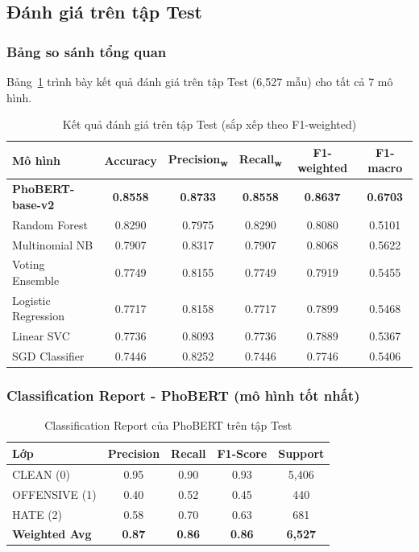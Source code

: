 \subsection{Đánh giá trên tập Test}

\subsubsection{Bảng so sánh tổng quan}

Bảng~\ref{tab:test_results} trình bày kết quả đánh giá trên tập Test (6{,}527 mẫu) cho tất cả 7 mô hình.

\begin{table}[H]
\centering
\caption{Kết quả đánh giá trên tập Test (sắp xếp theo F1-weighted)}
\label{tab:test_results}
\begin{tabular}{|l|c|c|c|c|c|}
\hline
\textbf{Mô hình} & \textbf{Accuracy} & \textbf{Precision\textsubscript{w}} & \textbf{Recall\textsubscript{w}} & \textbf{F1-weighted} & \textbf{F1-macro} \\
\hline
\textbf{PhoBERT-base-v2} & \textbf{0.8558} & \textbf{0.8733} & \textbf{0.8558} & \textbf{0.8637} & \textbf{0.6703} \\
Random Forest & 0.8290 & 0.7975 & 0.8290 & 0.8080 & 0.5101 \\
Multinomial NB & 0.7907 & 0.8317 & 0.7907 & 0.8068 & 0.5622 \\
Voting Ensemble & 0.7749 & 0.8155 & 0.7749 & 0.7919 & 0.5455 \\
Logistic Regression & 0.7717 & 0.8158 & 0.7717 & 0.7899 & 0.5468 \\
Linear SVC & 0.7736 & 0.8093 & 0.7736 & 0.7889 & 0.5367 \\
SGD Classifier & 0.7446 & 0.8252 & 0.7446 & 0.7746 & 0.5406 \\
\hline
\end{tabular}
\end{table}

\subsubsection{Classification Report - PhoBERT (mô hình tốt nhất)}

\begin{table}[H]
\centering
\caption{Classification Report của PhoBERT trên tập Test}
\label{tab:phobert_report}
\begin{tabular}{|l|c|c|c|c|}
\hline
\textbf{Lớp} & \textbf{Precision} & \textbf{Recall} & \textbf{F1-Score} & \textbf{Support} \\
\hline
CLEAN (0) & 0.95 & 0.90 & 0.93 & 5{,}406 \\
OFFENSIVE (1) & 0.40 & 0.52 & 0.45 & 440 \\
HATE (2) & 0.58 & 0.70 & 0.63 & 681 \\
\hline
\textbf{Weighted Avg} & \textbf{0.87} & \textbf{0.86} & \textbf{0.86} & \textbf{6{,}527} \\
\hline
\end{tabular}
\end{table}

